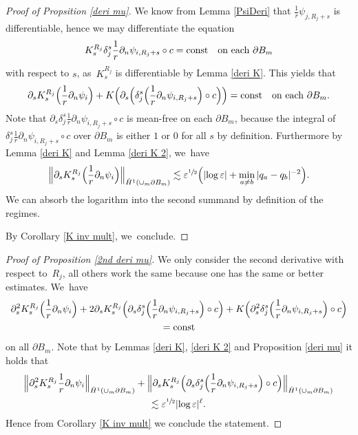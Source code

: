 \documentclass[JEP,XML,SOM,Unicode,published]{cedram}
\let\epsilon\varepsilon
\newcommand{\const}{\textup{const}}
\theoremstyle{definition}
\newcommand\Bnorm[1]{\Bigl\lVert #1\Bigr\rVert}
\newcommand\eq{=}
\let\de\partial
\let\eps\epsilon
\begin{document}
\begin{proof}[Proof of Propsition \ref{deri mu}]
We know from Lemma \ref{PsiDeri} that $\frac{1}{r}\psi_{j,R_j+s}$ is differentiable, hence we may differentiate the equation
\begin{align*}
K_s^{R_j}\delta_j^s\frac{1}{r}\de_n\psi_{i,R_j+s}\circ c\eq \const \quad\text{on each $\de B_m$}
\end{align*}
with respect to $s$, as~$K_s^{R_j}$ is differentiable by Lemma \ref{deri K}. This yields that
\begin{align*}
\de_sK_s^{R_j}\Bigl(\frac{1}{r}\de_n\psi_{i}\Bigr)+K\Bigl(\de_s\Bigl(\delta_j^s\Bigl(\frac{1}{r}\de_n\psi_{i,R_j+s}\Bigr)\circ c\Bigr)\Bigr)\eq \const \quad\text{on each $\de B_m$}.
\end{align*}
Note that $\de_s\delta_j^s\frac{1}{r}\de_n\psi_{i,R_j+s}\circ c$ is mean-free on each $\de B_m$, because the integral of \linebreak$\delta_j^s\frac{1}{r}\de_n\psi_{i,R_j+s}\circ c$ over $\de B_m$ is either $1$ or $0$ for all $s$ by definition. Furthermore by Lemma \ref{deri K} and Lemma \ref{deri K 2}, we~have
\begin{align*}
\Bnorm{\de_sK_s^{R_j}\Bigl(\frac{1}{r}\de_n\psi_{i}\Bigr)}_{\dot{H}^1(\cup_m \de B_m)}\lesssim \eps^{\sfrac{1}{2}}\Bigl(|{\log\eps}|+\min_{a\neq b}|q_a-q_b|^{-2}\Bigr).
\end{align*}
We can absorb the logarithm into the second summand by definition of the regimes.

By Corollary \ref{K inv mult}, we~conclude.
\end{proof}

\begin{proof}[Proof of Proposition \ref{2nd deri mu}]
We only consider the second derivative with respect to~$R_j$, all others work the same because one has the same or better estimates.
We~have
\begin{multline*}
\de_s^2K_s^{R_j}\Bigl(\frac{1}{r}\de_n\psi_i\Bigr)+2\de_sK_s^{R_j}\Bigl(\de_s\delta_j^s\Bigl(\frac{1}{r}\de_n\psi_{i,R_j+s}\Bigr)\circ c\Bigr)+K\Bigl(\de_s^2\delta_j^s\Bigl(\frac{1}{r}\de_n\psi_{i,R_j+s}\Bigr)\circ c\Bigr)\\
\eq \const
\end{multline*}
on all $\de B_m$.
Note that by Lemmas \ref{deri K}, \ref{deri K 2} and Proposition \ref{deri mu} it holds that
\begin{multline*}
\Bnorm{\de_s^2K_s^{R_j}\frac{1}{r}\de_n\psi_i}_{\dot{H}^1(\cup_m\de B_m)}+\Bnorm{\de_sK_s^{R_j}\Bigl(\de_s\delta_j^s\Bigl(\frac{1}{r}\de_n\psi_{i,R_j+s}\Bigr)\circ c\Bigr)}_{\dot{H}^1(\cup_m\de B_m)}\\
\lesssim\eps^{\sfrac{1}{2}}|{\log\eps}|^\ell.
\end{multline*}
Hence from Corollary \ref{K inv mult} we conclude the statement.\end{proof}
\end{document}
